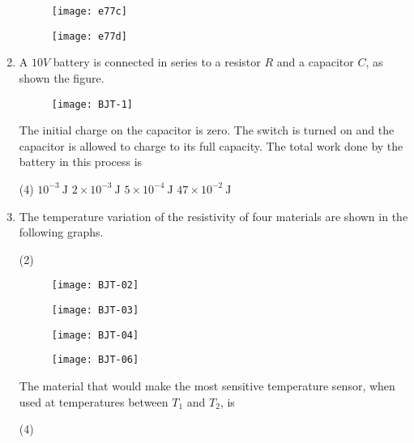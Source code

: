\begin{enumerate}
\begin{tasks}
\begin{figure}[H]
		\end{figure}
		\task[\textbf{C.}] \begin{figure}[H]
			\centering
			\texttt{[image: e77c]}
		\end{figure}
		\task[\textbf{D.}] \begin{figure}[H]
			\centering
			\texttt{[image: e77d]}
		\end{figure}
	\end{tasks}
	\item A $10 V$ battery is connected in series to a resistor $R$ and a capacitor $C$, as shown the figure.\\\begin{figure}[H]
		\centering
		\texttt{[image: BJT-1]}
	\end{figure}
	The initial charge on the capacitor is zero. The switch is turned on and the capacitor is allowed to charge to its full capacity. The total work done by the battery in this process is
	{}
	\begin{tasks}(4)
		\task[\textbf{A.}] $10^{-3} \mathrm{~J}$
		\task[\textbf{B.}] $2 \times 10^{-3} \mathrm{~J}$
		\task[\textbf{C.}] $5 \times 10^{-4} \mathrm{~J}$
		\task[\textbf{D.}] $47 \times 10^{-2} \mathrm{~J}$
	\end{tasks}
	\item The temperature variation of the resistivity of four materials are shown in the following graphs.
	\begin{tasks}(2)
		\task[\textbf{A.}] \begin{figure}[H]
			\centering
			\texttt{[image: BJT-02]}
		\end{figure}
		\task[\textbf{B.}]\begin{figure}[H]
			\centering
			\texttt{[image: BJT-03]}
		\end{figure}
		\task[\textbf{C.}] \begin{figure}[H]
			\centering
			\texttt{[image: BJT-04]}
		\end{figure}
		\task[\textbf{D.}] \begin{figure}[H]
			\centering
			\texttt{[image: BJT-06]}
		\end{figure}
	\end{tasks}
	The material that would make the most sensitive temperature sensor, when used at temperatures between $T_{1}$ and $T_{2}$, is
	{}
	\begin{tasks}(4)

\end{tasks}
\end{enumerate}
